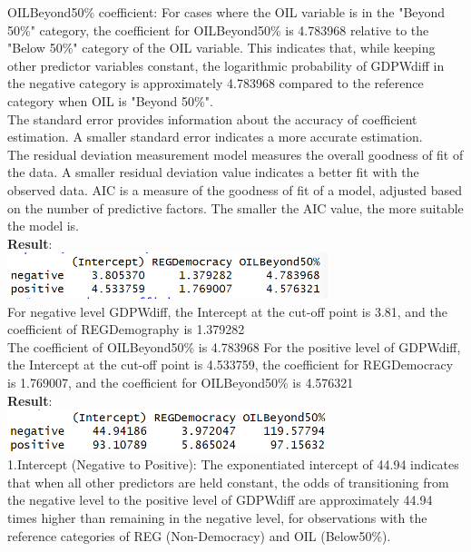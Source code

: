\documentclass[12pt,letterpaper]{article}
\begin{document}
\begin{enumerate}
	OILBeyond50\% coefficient: For cases where the OIL variable is in the "Beyond 50\%" category, the coefficient for OILBeyond50\% is 4.783968 relative to the "Below 50\%" category of the OIL variable. This indicates that, while keeping other predictor variables constant, the logarithmic probability of GDPWdiff in the negative category is approximately 4.783968 compared to the reference category when OIL is "Beyond 50\%".
	\\
	The standard error provides information about the accuracy of coefficient estimation. A smaller standard error indicates a more accurate estimation.\\
	The residual deviation measurement model measures the overall goodness of fit of the data. A smaller residual deviation value indicates a better fit with the observed data. AIC is a measure of the goodness of fit of a model, adjusted based on the number of predictive factors. The smaller the AIC value, the more suitable the model is.
	\\
	 
	\textbf{Result}:\\
	\includegraphics[width=0.7\textwidth]{Q1_4.png}\\
	
	For negative level GDPWdiff, the Intercept at the cut-off point is 3.81, and the coefficient of REGDemography is 1.379282\\
	The coefficient of OILBeyond50\% is 4.783968
	For the positive level of GDPWdiff, the Intercept at the cut-off point is 4.533759, the coefficient for REGDemocracy is 1.769007, and the coefficient for OILBeyond50\% is 4.576321
	\\
	 
	\textbf{Result}:\\
	\includegraphics[width=0.7\textwidth]{Q1_2.png}\\
	1.Intercept (Negative to Positive): The exponentiated intercept of 44.94 indicates that when all other predictors are held constant, the odds of transitioning from the negative level to the positive level of GDPWdiff are approximately 44.94 times higher than remaining in the negative level, for observations with the reference categories of REG (Non-Democracy) and OIL (Below50\%).\\ 
	

\end{enumerate}
\end{document}
